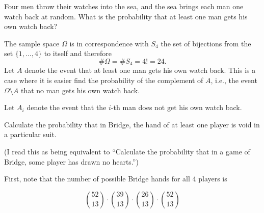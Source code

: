 \begin{problem}[Handout 2, \# 5]
  Four men throw their watches into the sea, and the sea brings each man
  one watch back at random. What is the probability that at least one man
  gets his own watch back?
\end{problem}
\begin{solution}
  The sample space \(\Omega\) is in correspondence with \(S_4\) the set of
  bijections from the set \(\{1,\dotsc,4\}\) to itself and therefore
  \begin{equation}
    \label{eq:2-1}
    \#\Omega=\# S_4=4!=24.
  \end{equation}
  Let \(A\) denote the event that at least one man gets his own watch
  back. This is a case where it is easier find the probability of the
  complement of \(A\), i.e., the event \(\Omega\setminus A\) that no man
  gets his own watch back.

  Let \(A_i\) denote the event that the \(i\)-th man does not get his own
  watch back.
\end{solution}
\newpage

\begin{problem}[Handout 2, \#7]
  Calculate the probability that in Bridge, the hand of at least one player
  is void in a particular suit.
\end{problem}
\begin{solution}

(I read this as being equivalent to ``Calculate the probability that in a game of Bridge, some player has drawn no hearts.'')

First, note that the number of possible Bridge hands for all 4 players is 

\[
\binom{52}{13} \cdot \binom{39}{13} \cdot \binom{26}{13} \cdot \binom{52}{13}
\]

\end{solution}
\newpage

